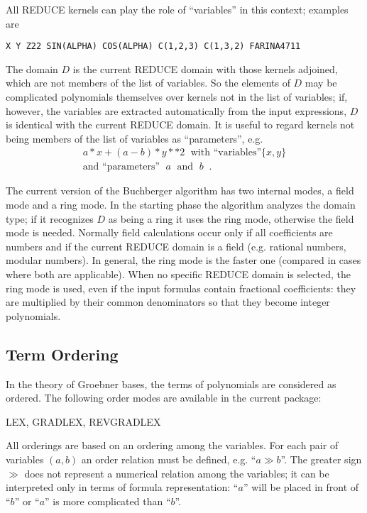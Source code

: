 All REDUCE kernels can play the role of ``variables'' in this context;
examples are

\begin{verbatim}
X Y Z22 SIN(ALPHA) COS(ALPHA) C(1,2,3) C(1,3,2) FARINA4711
\end{verbatim}

The domain $D$ is the current REDUCE domain with those kernels
adjoined, which are not members of the list of variables. So the
elements of $D$ may be complicated polynomials themselves over
kernels not in the list of variables; if, however, the variables are
extracted automatically from the input expressions, $D$ is identical
with the current REDUCE domain. It is useful to regard kernels not
being members of the list of variables as ``parameters'', e.g.
\[
\begin{array}{c}
 a * x + (a - b) * y**2 \;\mbox{ with ``variables''}\{x,y\} \\
\mbox{and ``parameters''  $\;a\;$ and $\;b\;$}\;.
\end{array}
\]

The current version of the Buchberger algorithm has two internal
modes, a field mode and a ring mode. In the starting phase the
algorithm analyzes the domain type; if it recognizes $D$ as being a
ring it uses the ring mode, otherwise the field mode is needed.
Normally field calculations occur only if all coefficients are numbers
and if the current REDUCE domain is a field (e.g. rational numbers,
modular numbers). In general, the ring mode is the faster one
(compared in cases where both are applicable). When no specific
REDUCE domain is selected, the ring mode is used, even if the input
formulas contain fractional coefficients: they are multiplied by their
common denominators so that they become integer polynomials.

\subsection{Term Ordering} \par
In the theory of Groebner bases, the terms of polynomials are
considered as ordered. The following order modes are available in
the current package:
 

\begin{center}
LEX, GRADLEX, REVGRADLEX
\end{center}

All orderings are based on an ordering among the variables. For
each pair of variables $(a,b)$ an order relation must be defined, e.g.
``$ a\gg b $''. The greater sign $\gg$  does not represent a numerical
relation among the variables; it can be interpreted only in terms of
formula representation: ``$a$'' will be placed in front of ``$b$'' or
``$a$''  is more complicated than ``$b$''.

